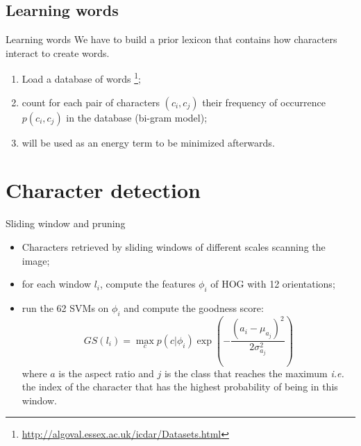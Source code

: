 \documentclass[handout]{beamer}
\begin{document}
\subsection{Learning words}

\begin{frame}{Learning words}
We have to build a prior lexicon that contains how characters interact to create words.
\begin{enumerate}
	\item Load a database of words \cite{ICDARword}\footnote{\url{http://algoval.essex.ac.uk/icdar/Datasets.html}};
	\item count for each pair of characters $(c_i,c_j)$ their frequency of occurrence $p(c_i,c_j)$ in the database (bi-gram model);
	\item will be used as an energy term to be minimized afterwards.
\end{enumerate}
\end{frame}





\section{Character detection}


\begin{frame}{Sliding window and pruning}
\begin{itemize}
	\item Characters retrieved by sliding windows of different scales scanning the image;
	\item for each window $l_i$, compute the features $\phi_i$ of HOG with 12 orientations;
	\item run the 62 SVMs on $\phi_i$ and compute the goodness score:
	\begin{equation}
	GS(l_i) = \max_c p(c|\phi_i) \exp\left( - \frac{(a_i - \mu_{a_j})^2}{2\sigma_{a_j}^2} \right)
	\label{eq:}
	\end{equation}
	where $a$ is the aspect ratio and $j$ is the class that reaches the maximum \emph{i.e.} the index of the character that has the highest probability of being in this window.
\end{itemize}
\end{frame}
\end{document}
